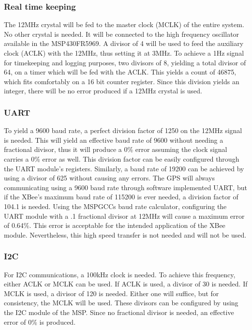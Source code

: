 \subsubsection{Real time keeping}
The 12MHz crystal will be fed to the master clock (MCLK) of the entire system. No other crystal is needed. It will be connected to the high frequency oscillator available in the MSP430FR5969. A divisor of 4 will be used to feed the auxiliary clock (ACLK) with the 12MHz, thus setting it at 3MHz. To achieve a 1Hz signal for timekeeping and logging purposes, two divisors of 8, yielding a total divisor of 64, on a timer which will be fed with the ACLK. This yields a count of 46875, which fits comfortably on a 16 bit counter register. Since this division yields an integer, there will be no error produced if a 12MHz crystal is used.

\subsubsection{UART}
To yield a 9600 baud rate, a perfect division factor of 1250 on the 12MHz signal is needed. This will yield an effective baud rate of 9600 without needing a fractional divisor, thus it will produce a 0\% error assuming the clock signal carries a 0\% error as well. This division factor can be easily configured through the UART module's registers. Similarly, a baud rate of 19200 can be achieved by using a divisor of 625 without causing any errors. The GPS will always communicating using a 9600 baud rate through software implemented UART, but if the XBee's maximum baud rate of 115200 is ever needed, a division factor of 104.1 is needed. Using the MSPGCCs baud rate calculator, configuring the UART module with a .1 fractional divisor at 12MHz will cause a maximum error of 0.64\%. This error is acceptable for the intended application of the XBee module. Nevertheless, this high speed transfer is not needed and will not be used.

\subsubsection{I2C}
For I2C communications, a 100kHz clock is needed. To achieve this frequency, either ACLK or MCLK can be used. If ACLK is used, a divisor of 30 is needed. If MCLK is used, a divisor of 120 is needed. Either one will suffice, but for consistency, the MCLK will be used. These divisors can be configured by using the I2C module of the MSP. Since no fractional divisor is needed, an effective error of 0\% is produced.

